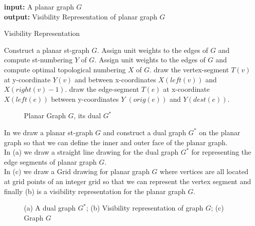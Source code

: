 \begin{algorithm}[H] 

\textbf{input:} { A planar graph $G$} \\
\textbf{output:} {Visibility Representation of planar graph $G$}

\caption{Visibility Representation}
\label{vr}

\begin{algorithmic}[1]
\STATE Construct a planar st-graph $G$.
\STATE Assign unit weights to the edges of $G$ and compute st-numbering $Y$ of $G$.
\STATE Assign unit weights to the edges of $G$ and compute optimal topological numbering $X$ of $G$.
 draw the vertex-segment $T(v)$ at y-coordinate $Y(v)$ and between x-coordinates $X(left(v))$ and $X(right(v)-1)$.\ENDFOR
{}\STATE draw the edge-segment $T(e)$ at x-coordinate $X (left(e))$ between y-coordinates $Y$ $(orig(e))$ and $Y(dest(e))$.\ENDFOR
\end{algorithmic}
\end{algorithm}




\begin{figure}[!tb]
\centering
\resizebox{80mm}{!}{}
\caption{Planar Graph $G$, its dual $G^{*}$}
\label{fig:barvisidual}
\end{figure}




In  we draw a planar st-graph $G$ and construct a dual graph $G^{*}$ on the planar graph so that we can define the inner and outer face of the planar graph.
\\
In  (a) we draw a straight line drawing for the dual graph $G^{*}$ for representing the edge segments of planar graph $G$.
\\
In  (c) we draw a Grid drawing for planar graph $G$ where vertices are all located at grid points of an integer grid so that we can represent the vertex segment and finally  (b) is a visibility representation for the planar graph $G$.




\begin{figure}[!tb]
\centering
\resizebox{100mm}{!}{}
\caption{(a) A dual graph $G^{*}$; (b) Visibility representation of graph $G$; (c) Graph $G$}
\label{fig:barvisi}
\end{figure}



